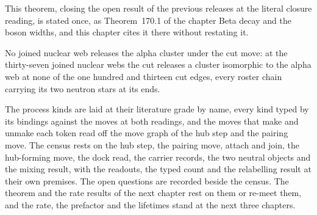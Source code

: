 \begin{chtheorem}\label{box:IX-1-decay-as-the-forward-edge-of-a-non-sink-the-move-graph-of-the-hub-step:5}
This theorem, closing the open result of the previous releases at the literal closure reading, is stated once, as Theorem~170.1 of the chapter Beta decay and the boson widths, and this chapter cites it there without restating it.
\end{chtheorem}
\begin{chwall}\label{box:IX-1-decay-as-the-forward-edge-of-a-non-sink-the-move-graph-of-the-hub-step:6}
No joined nuclear web releases the alpha cluster under the cut move: at the thirty-seven joined nuclear webs the cut releases a cluster isomorphic to the alpha web at none of the one hundred and thirteen cut edges, every roster chain carrying its two neutron stars at its ends.
\end{chwall}
The process kinds are laid at their literature grade by name, every kind typed by its bindings against the moves at both readings, and the moves that make and unmake each token read off the move graph of the hub step and the pairing move. The census rests on the hub step, the pairing move, attach and join, the hub-forming move, the dock read, the carrier records, the two neutral objects and the mixing result, with the readouts, the typed count and the relabelling result at their own premises. The open questions are recorded beside the census. The theorem and the rate results of the next chapter rest on them or re-meet them, and the rate, the prefactor and the lifetimes stand at the next three chapters.

